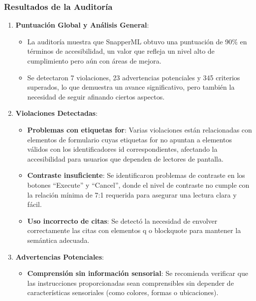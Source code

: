 \subsubsection{Resultados de la Auditoría}
\begin{enumerate}
    \item \textbf{Puntuación Global y Análisis General}:
          \begin{itemize}
              \item La auditoría muestra que SnapperML obtuvo una puntuación de 90\% en términos de accesibilidad, un valor que refleja un nivel alto de cumplimiento pero aún con áreas de mejora.

              \item Se detectaron 7 violaciones, 23 advertencias potenciales y 345 criterios superados, lo que demuestra un avance significativo, pero también la necesidad de seguir afinando ciertos aspectos.
          \end{itemize}
    \item \textbf{Violaciones Detectadas}:
          \begin{itemize}
              \item \textbf{Problemas con etiquetas for}: Varias violaciones están relacionadas con elementos de formulario cuyas etiquetas for no apuntan a elementos válidos con los identificadores id correspondientes, afectando la accesibilidad para usuarios que dependen de lectores de pantalla.

              \item \textbf{Contraste insuficiente}: Se identificaron problemas de contraste en los botones “Execute” y “Cancel”, donde el nivel de contraste no cumple con la relación mínima de 7:1 requerida para asegurar una lectura clara y fácil.

              \item \textbf{Uso incorrecto de citas}: Se detectó la necesidad de envolver correctamente las citas con elementos q o blockquote para mantener la semántica adecuada.
          \end{itemize}
    \item \textbf{Advertencias Potenciales}:
          \begin{itemize}
              \item \textbf{Comprensión sin información sensorial}: Se recomienda verificar que las instrucciones proporcionadas sean comprensibles sin depender de características sensoriales (como colores, formas o ubicaciones).


\end{itemize}
\end{enumerate}

